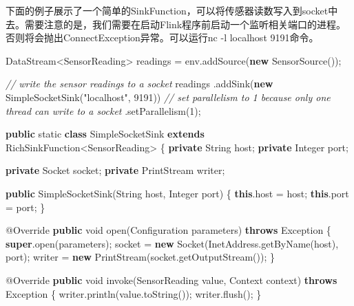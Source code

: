 \documentclass[cn,11pt,chinese]{elegantbook}
\newenvironment{Shaded}{}{}
\newcommand{\AttributeTok}[1]{\textcolor[rgb]{0.49,0.56,0.16}{#1}}
\newcommand{\BuiltInTok}[1]{#1}
\newcommand{\CommentTok}[1]{\textcolor[rgb]{0.38,0.63,0.69}{\textit{#1}}}
\newcommand{\DataTypeTok}[1]{\textcolor[rgb]{0.56,0.13,0.00}{#1}}
\newcommand{\DecValTok}[1]{\textcolor[rgb]{0.25,0.63,0.44}{#1}}
\newcommand{\FunctionTok}[1]{\textcolor[rgb]{0.02,0.16,0.49}{#1}}
\newcommand{\KeywordTok}[1]{\textcolor[rgb]{0.00,0.44,0.13}{\textbf{#1}}}
\newcommand{\NormalTok}[1]{#1}
\newcommand{\StringTok}[1]{\textcolor[rgb]{0.25,0.44,0.63}{#1}}
\begin{document}
下面的例子展示了一个简单的SinkFunction，可以将传感器读数写入到socket中去。需要注意的是，我们需要在启动Flink程序前启动一个监听相关端口的进程。否则将会抛出ConnectException异常。可以运行nc
-l localhost 9191命令。

\begin{Shaded}
\begin{Highlighting}[]
\NormalTok{DataStream\textless{}SensorReading\textgreater{} readings = env.}\FunctionTok{addSource}\NormalTok{(}\KeywordTok{new} \FunctionTok{SensorSource}\NormalTok{());}

\CommentTok{// write the sensor readings to a socket}
\NormalTok{readings}
\NormalTok{    .}\FunctionTok{addSink}\NormalTok{(}\KeywordTok{new} \FunctionTok{SimpleSocketSink}\NormalTok{(}\StringTok{"localhost"}\NormalTok{, }\DecValTok{9191}\NormalTok{))}
    \CommentTok{// set parallelism to 1 because only one thread can write to a socket}
\NormalTok{    .}\FunctionTok{setParallelism}\NormalTok{(}\DecValTok{1}\NormalTok{);}

\KeywordTok{public} \DataTypeTok{static} \KeywordTok{class}\NormalTok{ SimpleSocketSink }\KeywordTok{extends}\NormalTok{ RichSinkFunction\textless{}SensorReading\textgreater{} \{}
    \KeywordTok{private} \BuiltInTok{String}\NormalTok{ host;}
    \KeywordTok{private} \BuiltInTok{Integer}\NormalTok{ port;}

    \KeywordTok{private} \BuiltInTok{Socket}\NormalTok{ socket;}
    \KeywordTok{private} \BuiltInTok{PrintStream}\NormalTok{ writer;}

    \KeywordTok{public} \FunctionTok{SimpleSocketSink}\NormalTok{(}\BuiltInTok{String}\NormalTok{ host, }\BuiltInTok{Integer}\NormalTok{ port) \{}
        \KeywordTok{this}\NormalTok{.}\FunctionTok{host}\NormalTok{ = host;}
        \KeywordTok{this}\NormalTok{.}\FunctionTok{port}\NormalTok{ = port;}
\NormalTok{    \}}

    \AttributeTok{@Override}
    \KeywordTok{public} \DataTypeTok{void} \FunctionTok{open}\NormalTok{(}\BuiltInTok{Configuration}\NormalTok{ parameters) }\KeywordTok{throws} \BuiltInTok{Exception}\NormalTok{ \{}
        \KeywordTok{super}\NormalTok{.}\FunctionTok{open}\NormalTok{(parameters);}
\NormalTok{        socket = }\KeywordTok{new} \BuiltInTok{Socket}\NormalTok{(}\BuiltInTok{InetAddress}\NormalTok{.}\FunctionTok{getByName}\NormalTok{(host), port);}
\NormalTok{        writer = }\KeywordTok{new} \BuiltInTok{PrintStream}\NormalTok{(socket.}\FunctionTok{getOutputStream}\NormalTok{());}
\NormalTok{    \}}

    \AttributeTok{@Override}
    \KeywordTok{public} \DataTypeTok{void} \FunctionTok{invoke}\NormalTok{(SensorReading value, }\BuiltInTok{Context}\NormalTok{ context) }\KeywordTok{throws} \BuiltInTok{Exception}\NormalTok{ \{}
\NormalTok{        writer.}\FunctionTok{println}\NormalTok{(value.}\FunctionTok{toString}\NormalTok{());}
\NormalTok{        writer.}\FunctionTok{flush}\NormalTok{();}
\NormalTok{    \}}


\end{Highlighting}
\end{Shaded}
\end{document}
